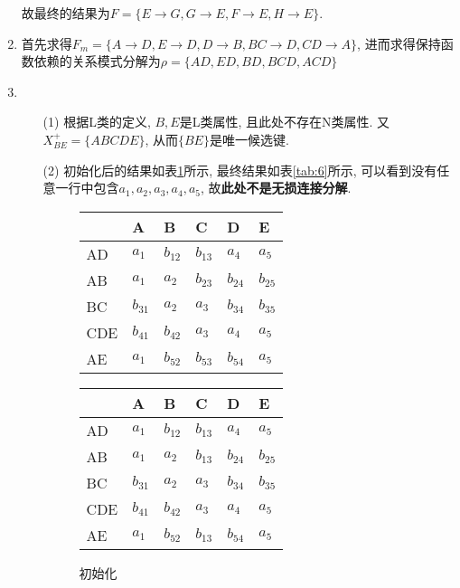 \documentclass[10pt, a4paper]{article}
\begin{document}
\begin{enumerate}
\begin{enumerate}
		\end{enumerate}
		故最终的结果为$F=\{E\to G, G\to E, F\to E, H\to E\}$.
		\item 首先求得$F_m=\{A\to D, E\to D, D\to B, BC\to D, CD\to A\}$, 进而求得保持函数依赖的关系模式分解为$\rho = \{AD, ED, BD, BCD, ACD\}$
		\item \begin{enumerate}
			\item[(1)] 根据L类的定义, $B, E$是L类属性, 且此处不存在N类属性. 又$X_{BE}^+ = \{ABCDE\}$, 从而$\{BE\}$是唯一候选键.
			\item[(2)] 初始化后的结果如表\ref{tab:1}所示, 最终结果如表\ref{tab:6}所示, 可以看到没有任意一行中包含$a_1, a_2, a_3, a_4, a_5$, 故\textbf{此处不是无损连接分解}.
			\begin{figure}[H]
				\begin{minipage}[b]{0.5\linewidth}
					\centering
					\begin{tabular}{|l|l|l|l|l|l|}
						\hline
							& A & B & C & D & E \\ \hline
						AD  & $a_1$ & $b_{12}$ & $b_{13}$  & $a_4$  & $a_5$  \\ \hline
						AB  & $a_1$ & $a_2$  & $b_{23}$  & $b_{24}$ & $b_{25}$  \\ \hline
						BC  & $b_{31}$ &  $a_2$ & $a_3$ & $b_{34}$ & $b_{35}$ \\ \hline
						CDE & $b_{41}$ & $b_{42}$ & $a_3$ & $a_4$ & $a_5$ \\ \hline
						AE  & $a_1$ & $b_{52}$ & $b_{53}$ & $b_{54}$ & $a_5$ \\ \hline
						\end{tabular}
						\caption{初始化}\label{tab:1}
				\end{minipage}
				\begin{minipage}[b]{0.5\linewidth}
					\centering
					\begin{tabular}{|l|l|l|l|l|l|}
						\hline
							& A & B & C & D & E \\ \hline
						AD  & $a_1$ & $b_{12}$ & $b_{13}$  & $a_4$  & $a_5$  \\ \hline
						AB  & $a_1$ & $a_2$  & $b_{13}$  & $b_{24}$ & $b_{25}$  \\ \hline
						BC  & $b_{31}$ &  $a_2$ & $a_3$ & $b_{34}$ & $b_{35}$ \\ \hline
						CDE & $b_{41}$ & $b_{42}$ & $a_3$ & $a_4$ & $a_5$ \\ \hline
						AE  & $a_1$ & $b_{52}$ & $b_{13}$ & $b_{54}$ & $a_5$ \\ \hline
						\end{tabular}

\end{minipage}
\end{figure}
\end{enumerate}
\end{enumerate}
\end{document}
